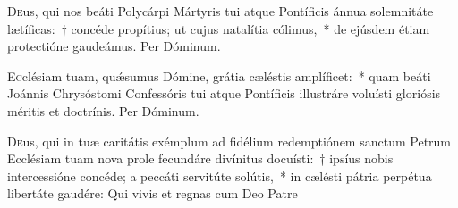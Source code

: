 \documentclass[vesperale_romanum.tex]{subfiles}
\begin{document}
\oratio

 \lettrine{D}{e}us, qui nos beáti Polycárpi Mártyris tui atque Pontíficis ánnua sole\-mnitáte lætíficas:~† concéde propítius; ut cujus natalítia cólimus,~* de ejúsdem étiam prote\-ctióne gaudeámus. Per Dóminum.
 
 \capitdeseq

\myrule


\duplexmtv


\oratio

\lettrine{E}{c}clésiam tuam, quǽsumus Dómine, grátia cæléstis amplíficet:~* quam beáti Joánnis Chrysóstomi Confessóris tui atque Pontíficis illustráre voluísti gloriósis méritis et do\-ctrínis. Per Dóminum.



\myrule


\duplexmtv


\oratio

 \lettrine{D}{e}us, qui in tuæ caritátis exémplum ad fidélium red\-em\-ptiónem san\-ctum Petrum Ecclésiam tuam nova prole fecundáre divínitus docuísti:~† i\-psíus nobis intercessióne concéde; a peccáti servitúte solútis,~* in cælésti pátria perpétua libertáte gaudére:
Qui vivis et regnas cum Deo Patre






\end{document}
